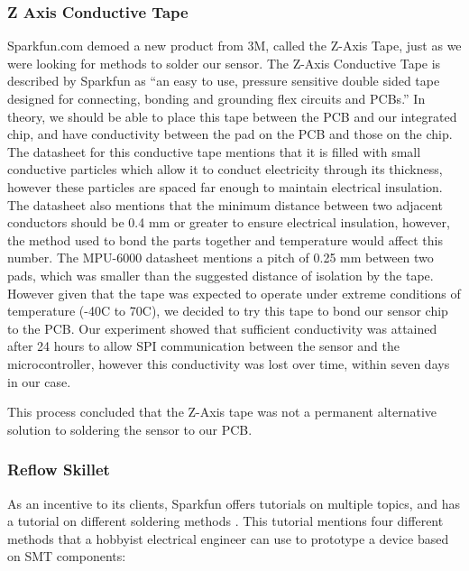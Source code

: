 \subsubsection{Z Axis Conductive Tape}
\label{Sec:ZTape}
Sparkfun.com demoed a new product from 3M,
called the Z-Axis Tape,
just as we were looking for methods to solder our sensor.
The Z-Axis Conductive Tape is described by Sparkfun as ``an easy to use,
pressure sensitive double sided tape designed for connecting,
bonding and grounding flex circuits and PCBs.''
In theory, we should be able to place this tape between the PCB and our integrated chip,
and have conductivity between the pad on the PCB and those on the chip.
The datasheet for this conductive tape mentions that it is filled with small conductive particles which allow it to conduct electricity through its thickness,
however these particles are spaced far enough to maintain electrical insulation.
The datasheet also mentions that the minimum distance between two adjacent conductors should be 0.4 mm or greater to ensure electrical insulation,
however, the method used to bond the parts together and temperature would affect this number.
The MPU-6000 datasheet mentions a pitch of 0.25 mm between two pads,
which was smaller than the suggested distance of isolation by the tape.
However given that the tape was expected to operate under extreme conditions of temperature (-40\degree C to 70\degree C),
we decided to try this tape to bond our sensor chip to the PCB.
Our experiment showed that sufficient conductivity was attained after 24 hours to allow SPI communication between the sensor and the microcontroller,
however this conductivity was lost over time,
within seven days in our case.

This process concluded that the Z-Axis tape was not a permanent alternative solution to soldering the sensor to our PCB.

\subsubsection{Reflow Skillet}
\label{Sec:ToasterReflow}
As an incentive to its clients,
Sparkfun offers tutorials on multiple topics,
and has a tutorial on different soldering methods \cite{Web:SparkfunSoldering}.
This tutorial mentions four different methods that a hobbyist electrical engineer can use to prototype a device based on SMT components:

